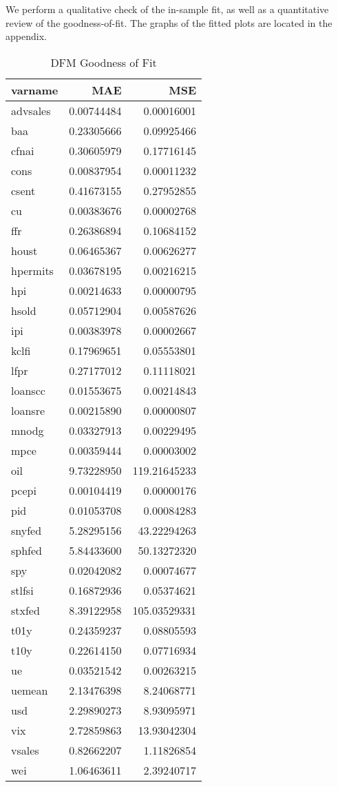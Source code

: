 \documentclass[11pt, letterpaper]{article}\usepackage[]{graphicx}\usepackage[]{color}
\begin{document}
We perform a qualitative check of the in-sample fit, as well as a quantitative review of the goodness-of-fit. The graphs of the fitted plots are located in the appendix.
\begin{table}[H]
\centering
\begingroup\footnotesize
\begin{tabular}{lrr}
  \hline
varname & MAE & MSE \\ 
  \hline
advsales & 0.00744484 & 0.00016001 \\ 
  baa & 0.23305666 & 0.09925466 \\ 
  cfnai & 0.30605979 & 0.17716145 \\ 
  cons & 0.00837954 & 0.00011232 \\ 
  csent & 0.41673155 & 0.27952855 \\ 
  cu & 0.00383676 & 0.00002768 \\ 
  ffr & 0.26386894 & 0.10684152 \\ 
  houst & 0.06465367 & 0.00626277 \\ 
  hpermits & 0.03678195 & 0.00216215 \\ 
  hpi & 0.00214633 & 0.00000795 \\ 
  hsold & 0.05712904 & 0.00587626 \\ 
  ipi & 0.00383978 & 0.00002667 \\ 
  kclfi & 0.17969651 & 0.05553801 \\ 
  lfpr & 0.27177012 & 0.11118021 \\ 
  loanscc & 0.01553675 & 0.00214843 \\ 
  loansre & 0.00215890 & 0.00000807 \\ 
  mnodg & 0.03327913 & 0.00229495 \\ 
  mpce & 0.00359444 & 0.00003002 \\ 
  oil & 9.73228950 & 119.21645233 \\ 
  pcepi & 0.00104419 & 0.00000176 \\ 
  pid & 0.01053708 & 0.00084283 \\ 
  snyfed & 5.28295156 & 43.22294263 \\ 
  sphfed & 5.84433600 & 50.13272320 \\ 
  spy & 0.02042082 & 0.00074677 \\ 
  stlfsi & 0.16872936 & 0.05374621 \\ 
  stxfed & 8.39122958 & 105.03529331 \\ 
  t01y & 0.24359237 & 0.08805593 \\ 
  t10y & 0.22614150 & 0.07716934 \\ 
  ue & 0.03521542 & 0.00263215 \\ 
  uemean & 2.13476398 & 8.24068771 \\ 
  usd & 2.29890273 & 8.93095971 \\ 
  vix & 2.72859863 & 13.93042304 \\ 
  vsales & 0.82662207 & 1.11826854 \\ 
  wei & 1.06463611 & 2.39240717 \\ 
   \hline
\end{tabular}
\endgroup
\caption{DFM Goodness of Fit} 
\end{table}
\end{document}
